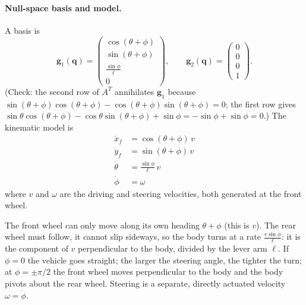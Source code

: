 \documentclass[11pt,a4paper]{article}
\theoremstyle{definition}
\theoremstyle{plain}
\theoremstyle{remark}
\newcommand{\q}{\boldsymbol{q}}
\newcommand{\g}{\boldsymbol{g}}
\begin{document}
\paragraph{Null-space basis and model.} A basis is
\[
  \g_1(\q)=\begin{pmatrix}\cos(\theta+\phi)\\ \sin(\theta+\phi)\\ \frac{\sin\phi}{\ell}\\0\end{pmatrix},\qquad
  \g_2(\q)=\begin{pmatrix}0\\0\\0\\1\end{pmatrix}.
\]
(Check: the second row of $A^T$ annihilates $\g_1$ because $\sin(\theta+\phi)\cos(\theta+\phi)-\cos(\theta+\phi)\sin(\theta+\phi)=0$; the first row gives $\sin\theta\cos(\theta+\phi)-\cos\theta\sin(\theta+\phi)+\sin\phi=-\sin\phi+\sin\phi=0$.) The kinematic model is
\begin{equation}
\boxed{\;
\begin{aligned}
  \dot x_f&=\cos(\theta+\phi)\,v\\
  \dot y_f&=\sin(\theta+\phi)\,v\\
  \dot\theta&=\frac{\sin\phi}{\ell}\,v\\
  \dot\phi&=\omega
\end{aligned}\;}
\label{eq:bike-km}
\end{equation}
where $v$ and $\omega$ are the driving and steering velocities, both generated at the front wheel.

\begin{intuition}
The front wheel can only move along its own heading $\theta+\phi$ (this is $v$). The rear wheel must follow, it cannot slip sideways, so the body turns at a rate $\frac{v\sin\phi}{\ell}$: it is the component of $v$ perpendicular to the body, divided by the lever arm $\ell$. If $\phi=0$ the vehicle goes straight; the larger the steering angle, the tighter the turn; at $\phi=\pm\pi/2$ the front wheel moves perpendicular to the body and the body pivots about the rear wheel. Steering is a separate, directly actuated velocity $\omega=\dot\phi$.
\end{intuition}
\end{document}
